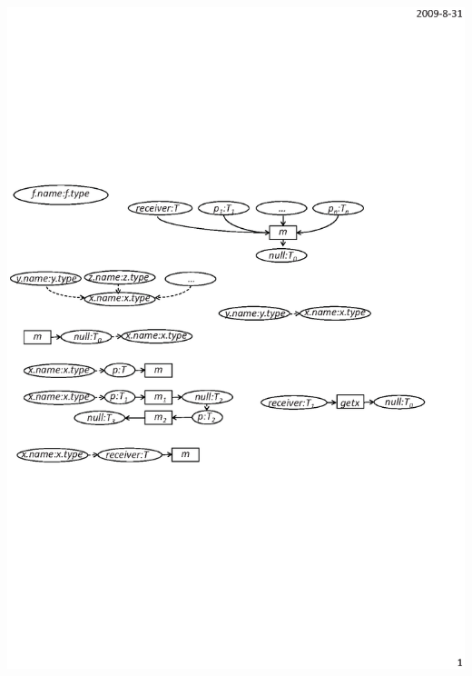 \begin{enumerate}
\begin{center}
\includegraphics[scale=0.7,clip]{figure/rule3.eps}%
\end{center}\vspace*{-3ex}
\end{enumerate}

